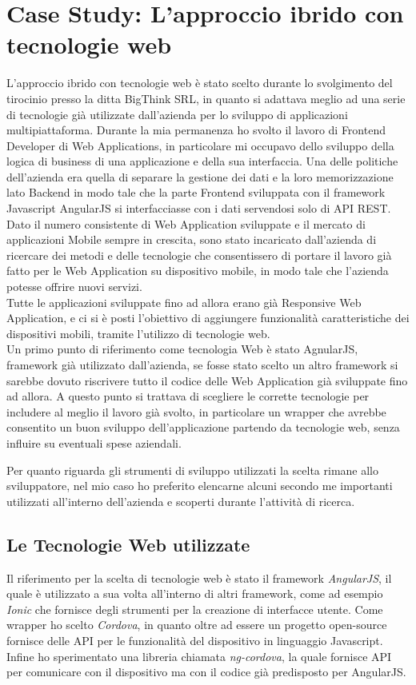 \chapter{Case Study: L'approccio ibrido con tecnologie web}
L'approccio ibrido con tecnologie web è stato scelto durante lo svolgimento del tirocinio presso la ditta BigThink SRL, in quanto si adattava meglio ad una serie di tecnologie già utilizzate dall'azienda per lo sviluppo di applicazioni multipiattaforma.
Durante la mia permanenza ho svolto il lavoro di Frontend Developer di Web Applications, in particolare mi occupavo dello sviluppo della logica di business di una applicazione e della sua interfaccia.
Una delle politiche dell'azienda era quella di separare la gestione dei dati e la loro memorizzazione lato Backend in modo tale che la parte Frontend sviluppata con il framework Javascript AngularJS si interfacciasse con i dati servendosi solo di API REST.
Dato il numero consistente di Web Application sviluppate e il mercato di applicazioni Mobile sempre in crescita, sono stato incaricato dall'azienda di ricercare dei metodi e delle tecnologie che consentissero di portare il lavoro già fatto per le Web Application su dispositivo mobile, in modo tale che l'azienda potesse offrire nuovi servizi.\\
Tutte le applicazioni sviluppate fino ad allora erano già Responsive Web Application, e ci si è posti l'obiettivo di aggiungere funzionalità caratteristiche dei dispositivi mobili, tramite l'utilizzo di tecnologie web.\\

Un primo punto di riferimento come tecnologia Web è stato AgnularJS, framework già utilizzato dall'azienda, se fosse stato scelto un altro framework si sarebbe dovuto riscrivere tutto il codice delle Web Application già sviluppate fino ad allora. A questo punto  si trattava di scegliere le corrette tecnologie per includere al meglio il lavoro già svolto, in particolare un wrapper che avrebbe consentito un buon sviluppo dell'applicazione partendo da tecnologie web, senza influire su eventuali spese aziendali. 

Per quanto riguarda gli strumenti di sviluppo utilizzati la scelta rimane allo sviluppatore, nel mio caso ho preferito elencarne alcuni secondo me importanti utilizzati all'interno dell'azienda e scoperti durante l'attività di ricerca.

\section{Le Tecnologie Web utilizzate}
Il riferimento per la scelta di tecnologie web è stato il framework \emph{AngularJS}, il quale è utilizzato a sua volta all'interno di altri framework, come ad esempio \emph{Ionic} che fornisce degli strumenti per la creazione di interfacce utente. Come wrapper ho scelto \emph{Cordova}, in quanto oltre ad essere un progetto open-source fornisce delle API per le funzionalità del dispositivo in linguaggio Javascript. Infine ho sperimentato una libreria chiamata \emph{ng-cordova}, la quale fornisce API per comunicare con il dispositivo ma con il codice già predisposto per AngularJS. 

